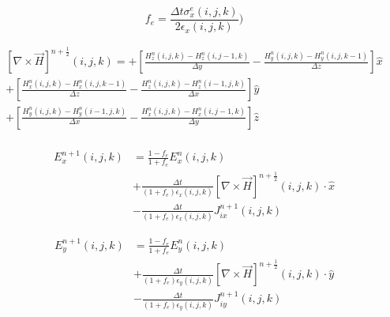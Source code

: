 \documentclass[10pt]{article}
\begin{document}
\begin{equation}
	\boxed{
		f_{e} = \frac{\Delta t \sigma^{e}_{x}(i,j,k)}{2\epsilon_{x}(i,j,k)} )
	}
\end{equation}


\begin{equation}
	\boxed{
		\begin{aligned}
			\left[\nabla \times \vec{H} \right]^{n+\frac{1}{2}}(i,j,k) =
			+\left[\frac{H^{n}_{z}(i,j,k)-H^{n}_{z}(i,j-1,k)}{\Delta y}
			-\frac{H^{n}_{y}(i,j,k)-H^{n}_{y}(i,j,k-1)}{\Delta z} \right] \hat{x} \\
			+\left[\frac{H^{n}_{x}(i,j,k)-H^{n}_{x}(i,j,k-1)}{\Delta z}
			-\frac{H^{n}_{z}(i,j,k)-H^{n}_{z}(i-1,j,k)}{\Delta x} \right] \hat{y} \\
			+\left[\frac{H^{n}_{y}(i,j,k)-H^{n}_{y}(i-1,j,k)}{\Delta x}
			-\frac{H^{n}_{x}(i,j,k)-H^{n}_{x}(i,j-1,k)}{\Delta y} \right] \hat{z} \\
		\end{aligned}
	}
\end{equation}

\begin{equation}
	\boxed{
		\begin{aligned}
			E^{n+1}_{x}(i,j,k) & = \frac{1-f_e}{1+f_e}  E^{n}_{x}(i,j,k)                                                                                 \\
			                   & + \frac{\Delta t}{(1+f_e)\epsilon_{x}(i,j,k)} \left[ \nabla \times \vec{H} \right]^{n+\frac{1}{2}}(i,j,k) \cdot \hat{x} \\
			                   & - \frac{\Delta t}{(1+f_e)\epsilon_{x}(i,j,k)} J^{n+1}_{ix}(i,j,k)
		\end{aligned}
	}
\end{equation}

\begin{equation}
	\boxed{
		\begin{aligned}
			E^{n+1}_{y}(i,j,k) & = \frac{1-f_e}{1+f_e}  E^{n}_{y}(i,j,k)                                                                                 \\
			                   & + \frac{\Delta t}{(1+f_e)\epsilon_{y}(i,j,k)} \left[ \nabla \times \vec{H} \right]^{n+\frac{1}{2}}(i,j,k) \cdot \hat{y} \\
			                   & - \frac{\Delta t}{(1+f_e)\epsilon_{y}(i,j,k)} J^{n+1}_{iy}(i,j,k)
		\end{aligned}
	}
\end{equation}
\end{document}
